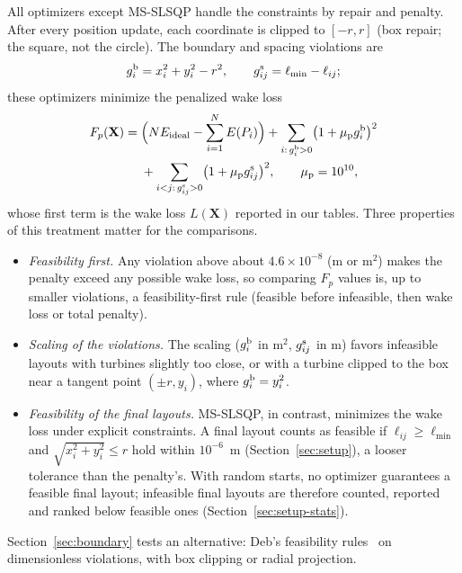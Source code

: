 All optimizers except MS-SLSQP handle the constraints by repair and penalty. After every position update, each coordinate is clipped to $[-r,r]$ (box repair; the square, not the circle). The boundary and spacing violations are
\begin{equation*}
g^{\rm b}_{i}=x_i^2+y_i^2-r^2,\qquad g^{\rm s}_{ij}=\ell_{\min}-\ell_{ij};
\end{equation*}
these optimizers minimize the penalized wake loss
\begin{equation}
\begin{split}
F_p(\mathbf X)={}&\Bigl(N E_{\rm ideal}-\sum_{i=1}^{N}E(P_i)\Bigr)+\sum_{i:\,g^{\rm b}_i>0}\bigl(1+\mu_{\rm p} g^{\rm b}_i\bigr)^2\\
&+\sum_{i<j:\,g^{\rm s}_{ij}>0}\bigl(1+\mu_{\rm p} g^{\rm s}_{ij}\bigr)^2,\qquad \mu_{\rm p}=10^{10},
\end{split}
\label{eq:penalty}
\end{equation}
whose first term is the wake loss $L(\mathbf X)$ reported in our tables. Three properties of this treatment matter for the comparisons.
\begin{itemize}
\item \emph{Feasibility first.} Any violation above about $4.6\times10^{-8}$ (m or m$^2$) makes the penalty exceed any possible wake loss, so comparing $F_p$ values is, up to smaller violations, a feasibility-first rule (feasible before infeasible, then wake loss or total penalty).
\item \emph{Scaling of the violations.} The scaling ($g^{\rm b}_i$ in m$^2$, $g^{\rm s}_{ij}$ in m) favors infeasible layouts with turbines slightly too close, or with a turbine clipped to the box near a tangent point $(\pm r,y_i)$, where $g^{\rm b}_i=y_i^2$.
\item \emph{Feasibility of the final layouts.} MS-SLSQP, in contrast, minimizes the wake loss under explicit constraints. A final layout counts as feasible if $\ell_{ij}\ge\ell_{\min}$ and $\sqrt{x_i^2+y_i^2}\le r$ hold within $10^{-6}$~m (Section~\ref{sec:setup}), a looser tolerance than the penalty's. With random starts, no optimizer guarantees a feasible final layout; infeasible final layouts are therefore counted, reported and ranked below feasible ones (Section~\ref{sec:setup-stats}).
\end{itemize}
Section~\ref{sec:boundary} tests an alternative: Deb's feasibility rules~\cite{Deb2000} on dimensionless violations, with box clipping or radial projection.
